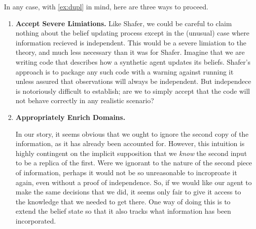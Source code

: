 \documentclass{article}
\begin{document}
In any case, with \cref{ex:dupl} in mind, here are three ways to proceed.

\begin{enumerate}
    \item \textbf{Accept Severe Limiations.} 
    Like Shafer, we could be careful 
    to claim nothing about the belief updating process except in the (unusual) case where 
    information recieved is independent.
    This would be a severe limiation to the theory, and much less necessary than it was for Shafer. 
    Imagine that we are writing code that describes how a synthetic agent updates its beliefs. Shafer's approach is to package any such code with a warning against running it unless assured that observations will always be independent. 
    But independece is notoriously difficult to establish; are we to simply accept that the code will not behave correctly in any realistic scenario?
    
    
    
    
    
    \item \textbf{Appropriately Enrich Domains.}

    In our story, it seems obvious that we ought to ignore the second copy of the information, as it has already been accounted for.
    However, this intuition is highly contingent on the implicit supposition that we \emph{know} the second input to be a replica of the first.
    Were we ignorant to the nature of the second piece of information, perhaps it would not be so unreasonable to incroproate it again, even without a proof of independence. 
    So, if we would like our agent to make the same decisions that we did, it seems only fair to give it access to the knowledge that we needed to get there. 
    One way of doing this is to extend the belief state so that it also tracks what information has been incorporated.  
    

\end{enumerate}
\end{document}
